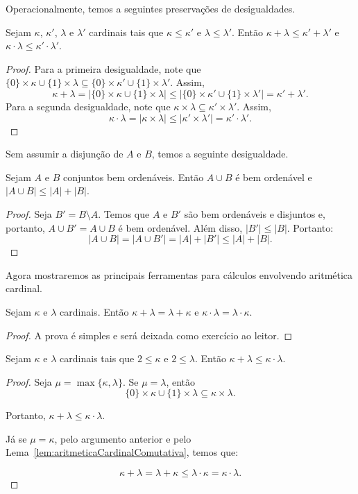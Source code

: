 Operacionalmente, temos a seguintes preservações de desigualdades.
\begin{lemma}
Sejam $\kappa$, $\kappa'$, $\lambda$ e $\lambda'$ cardinais tais que $\kappa \leq \kappa'$ e $\lambda \leq \lambda'$.
Então $\kappa + \lambda \leq \kappa' + \lambda'$ e $\kappa \cdot \lambda \leq \kappa' \cdot \lambda'$.
\end{lemma}
\begin{proof}
    Para a primeira desigualdade, note que $\{0\}\times \kappa \cup \{1\}\times \lambda \subseteq \{0\}\times \kappa' \cup \{1\}\times \lambda'$.
    Assim,
    \[
    \kappa + \lambda = |\{0\}\times \kappa \cup \{1\}\times \lambda| \leq |\{0\}\times \kappa' \cup \{1\}\times \lambda'| = \kappa' + \lambda'.
    \]
    Para a segunda desigualdade, note que $\kappa \times \lambda \subseteq \kappa' \times \lambda'$.
    Assim,
    \[
    \kappa \cdot \lambda = |\kappa \times \lambda| \leq |\kappa' \times \lambda'| = \kappa' \cdot \lambda'.
    \]
\end{proof}

Sem assumir a disjunção de $A$ e $B$, temos a seguinte desigualdade.
\begin{lemma}
Sejam $A$ e $B$ conjuntos bem ordenáveis.
Então $A\cup B$ é bem ordenável e $|A\cup B|\leq |A|+|B|$.
\end{lemma}
\begin{proof}
    Seja $B'=B\setminus A$.
    Temos que $A$ e $B'$ são bem ordenáveis e disjuntos e, portanto, $A\cup B'=A\cup B$ é bem ordenável.
    Além disso, $|B'|\leq |B|$.
    Portanto:
    \[
    |A\cup B| = |A\cup B'| = |A| + |B'| \leq |A| + |B|.
    \]
\end{proof}

Agora mostraremos as principais ferramentas para cálculos envolvendo aritmética cardinal.

\begin{lemma}\label{lem:aritmeticaCardinalComutativa}
    Sejam $\kappa$ e $\lambda$ cardinais. Então $\kappa + \lambda=\lambda+\kappa$ e $\kappa \cdot \lambda=\lambda \cdot \kappa$.
\end{lemma}
\begin{proof}
    A prova é simples e será deixada como exercício ao leitor.
\end{proof}

\begin{lemma}\label{lem:aritmeticaCardinalBasica}
    Sejam $\kappa$ e $\lambda$ cardinais tais que $2\leq \kappa$ e $2\leq \lambda$.
    Então $\kappa + \lambda\leq \kappa \cdot \lambda$.
\end{lemma}
\begin{proof}
    Seja $\mu=\max\{\kappa, \lambda\}$.
    Se $\mu=\lambda$, então
    \[
    \{0\}\times \kappa \cup \{1\}\times \lambda \subseteq \kappa \times \lambda.
    \]

    Portanto, $\kappa+\lambda\leq \kappa\cdot \lambda$.

    Já se $\mu=\kappa$, pelo argumento anterior e pelo Lema~\ref{lem:aritmeticaCardinalComutativa}, temos que:

    \[
    \kappa+\lambda = \lambda + \kappa \leq \lambda \cdot \kappa = \kappa \cdot \lambda.
    \]
\end{proof}

